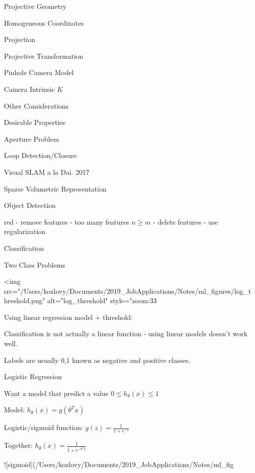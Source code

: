 \begin{section}
\begin{subsubsection}
\begin{subsubsection}
\begin{subsubsection}
\begin{section}{Projective Geometry}
\begin{subsection}{Homogeneous Coordinates}
\begin{subsubsection}
{\begin{subsubsection}{Projection}
\begin{subsubsection}{Projective Transformation}
\begin{subsection}
\begin{subsubsection}
\begin{subsubsection}
\begin{subsubsection}
{\begin{subsubsection}
\begin{subsection}
\begin{subsection} {Pinhole Camera Model}
\begin{subsection} {Camera Intrinsic $K$}
\begin{subsection}
\begin{subsection}
\begin{subsubsection}{Other Considerations}
{\begin{subsection}
\begin{subsubsection}{Desirable Properties}
\begin{section}
\begin{subsection}
\begin{subsection}
\begin{subsection}
\begin{section}
\begin{subsection}
\begin{subsubsection}
\begin{subsubsection}
\begin{subsection}
\begin{section}
\begin{subsection}
\begin{subsubsection}{Aperture Problem}
\begin{subsubsection}
{\begin{section}
\begin{subsubsection}
\begin{subsubsection}
\begin{subsubsection}
\begin{subsection}
\begin{subsection}
\begin{subsection}
\begin{subsection}
\begin{subsection}
\begin{subsection}
\begin{subsection}
\begin{subsubsection}
{\begin{subsubsection}
{\begin{subsubsection}
\begin{section}
\begin{section}
\begin{section}
\begin{subsubsection}
\begin{subsubsection}{Loop Detection/Closure}
\begin{subsubsection}{Visual SLAM a la Dai. 2017}
\begin{subsubsection}{Sparse Volumetric Representation}
\begin{subsection}
\begin{section}{Object Detection}
\begin{subsubsection}
{\begin{subsection}
\begin{subsection}
\begin{section}
\begin{section}
\begin{subsection}
\begin{subsubsection}
\begin{subsubsection}
\begin{subsection}
\begin{subsection}
\begin{subsubsection}
\begin{subsubsection}
\begin{subsubsection}
{\begin{subsection}
\begin{subsection}
\begin{subsection}
\begin{subsection}
red
  - remove features
- too many features $n\ge m$ 
  - delete features 
  - use regularization

\begin{section} Classification

\begin{subsection} Two Class Problems

<img src="/Users/kozlovy/Documents/2019_JobApplications/Notes/ml_figures/log_threshold.png" alt="log_threshold" style="zoom:33%

Using linear regression model + threshold:

Classification is not actually a linear function - using linear models doesn't work well.

Labels are usually {0,1} known as negative and positive classes.

\begin{subsubsection} Logistic Regression

Want a model that predict a value $0\le h_\theta(x)\le 1$

Model: $h_\theta(x)=g(\theta^T x)$ 

Logistic/sigmoid function: $g(z) = \frac{1}{1+e^{-z}}$

Together: $h_\theta(x)=\frac{1}{1+e^{-\theta^T x}}$

![sigmoid](/Users/kozlovy/Documents/2019_JobApplications/Notes/ml_fig
\end{subsubsection}
\end{subsection}
\end{section}
\end{subsection}
\end{subsection}
\end{subsection}
\end{subsection}}
\end{subsubsection}
\end{subsubsection}
\end{subsubsection}
\end{subsection}
\end{subsection}
\end{subsubsection}
\end{subsubsection}
\end{subsection}
\end{section}
\end{section}
\end{subsection}
\end{subsection}}
\end{subsubsection}
\end{section}
\end{subsection}
\end{subsubsection}
\end{subsubsection}
\end{subsubsection}
\end{subsubsection}
\end{section}
\end{section}
\end{section}
\end{subsubsection}}
\end{subsubsection}}
\end{subsubsection}
\end{subsection}
\end{subsection}
\end{subsection}
\end{subsection}
\end{subsection}
\end{subsection}
\end{subsection}
\end{subsubsection}
\end{subsubsection}
\end{subsubsection}
\end{section}}
\end{subsubsection}
\end{subsubsection}
\end{subsection}
\end{section}
\end{subsection}
\end{subsubsection}
\end{subsubsection}
\end{subsection}
\end{section}
\end{subsection}
\end{subsection}
\end{subsection}
\end{section}
\end{subsubsection}
\end{subsection}}
\end{subsubsection}
\end{subsection}
\end{subsection}
\end{subsection}
\end{subsection}
\end{subsection}
\end{subsubsection}}
\end{subsubsection}
\end{subsubsection}
\end{subsubsection}
\end{subsection}
\end{subsubsection}
\end{subsubsection}}
\end{subsubsection}
\end{subsection}
\end{section}
\end{subsubsection}
\end{subsubsection}
\end{subsubsection}
\end{section}
